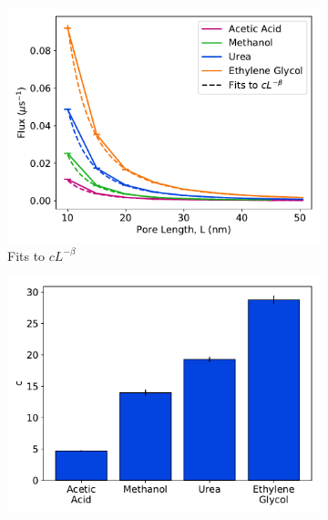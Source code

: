 \documentclass{article}
\begin{document}
  
  \begin{figure}
  \centering
  \begin{subfigure}{0.325\textwidth}
  \includegraphics[width=\textwidth]{flux_curves.pdf}
  \caption{Fits to $cL^{-\beta}$}\label{fig:flux_curves_regular}
  \end{subfigure}
  \begin{subfigure}{0.325\textwidth}
  \includegraphics[width=\textwidth]{c_parameters.pdf}

\end{subfigure}
\end{figure}
\end{document}
